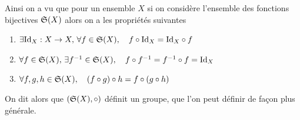 Ainsi on a vu que pour un ensemble $X$ si on considère l'ensemble des fonctions bijectives $\S(X)$ alors on a les propriétés suivantes
\begin{enumerate}
	\item $\exists \mathrm{Id}_X : X \to X, \,\forall f \in \S(X), \quad f \circ \mathrm{Id}_X = \mathrm{Id}_X \circ f$
	\item $\forall f \in \S(X), \, \exists f^{-1} \in \S(X), \quad f \circ f^{-1} = f^{-1} \circ f = \mathrm{Id}_X$
	\item $\forall f,g,h \in \S(X), \quad (f \circ g) \circ h = f \circ (g \circ h)$
\end{enumerate}
On dit alors que $(\S(X), \circ)$ définit un groupe, que l'on peut définir de façon plus générale.



